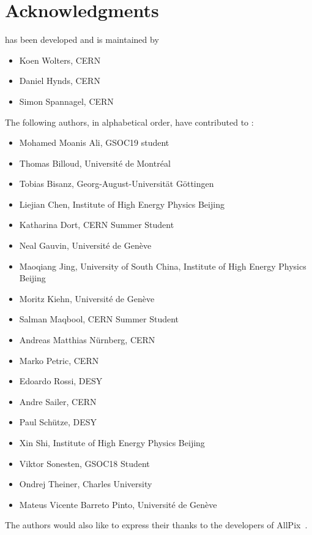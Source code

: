\chapter{Acknowledgments}

\apsq has been developed and is maintained by

\begin{itemize}
\item Koen Wolters, CERN
\item Daniel Hynds, CERN
\item Simon Spannagel, CERN
\end{itemize}

The following authors, in alphabetical order, have contributed to \apsq:

\begin{itemize}
\item Mohamed Moanis Ali, GSOC19 student
\item Thomas Billoud, Université de Montréal
\item Tobias Bisanz, Georg-August-Universität Göttingen
\item Liejian Chen, Institute of High Energy Physics Beijing
\item Katharina Dort, CERN Summer Student
\item Neal Gauvin, Université de Genève
\item Maoqiang Jing, University of South China, Institute of High Energy Physics Beijing
\item Moritz Kiehn, Université de Genève
\item Salman Maqbool, CERN Summer Student
\item Andreas Matthias Nürnberg, CERN
\item Marko Petric, CERN
\item Edoardo Rossi, DESY
\item Andre Sailer, CERN
\item Paul Schütze, DESY
\item Xin Shi, Institute of High Energy Physics Beijing
\item Viktor Sonesten, GSOC18 Student
\item Ondrej Theiner, Charles University
\item Mateus Vicente Barreto Pinto, Université de Genève
\end{itemize}

The authors would also like to express their thanks to the developers of AllPix~\cite{ap1wiki,ap1git}.
